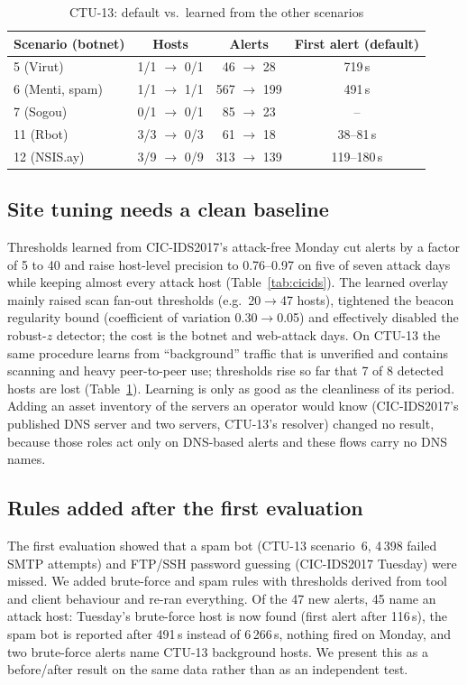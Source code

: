 \documentclass[conference]{IEEEtran}
\begin{document}
\begin{table}[t]
\caption{CTU-13: default vs.\ learned from the other scenarios}\label{tab:ctu}
\centering\footnotesize
\begin{tabular}{@{}lccc@{}}
\toprule
Scenario (botnet) & Hosts & Alerts & First alert (default) \\
\midrule
5 (Virut) & 1/1 $\to$ 0/1 & 46 $\to$ 28 & 719\,s \\
6 (Menti, spam) & 1/1 $\to$ 1/1 & 567 $\to$ 199 & 491\,s \\
7 (Sogou) & 0/1 $\to$ 0/1 & 85 $\to$ 23 & -- \\
11 (Rbot) & 3/3 $\to$ 0/3 & 61 $\to$ 18 & 38--81\,s \\
12 (NSIS.ay) & 3/9 $\to$ 0/9 & 313 $\to$ 139 & 119--180\,s \\
\bottomrule
\end{tabular}
\end{table}

\subsection{Site tuning needs a clean baseline}
Thresholds learned from CIC-IDS2017's attack-free Monday cut alerts by a factor of 5 to 40 and raise host-level precision to 0.76--0.97 on five of seven attack days while keeping almost every attack host (Table~\ref{tab:cicids}). The learned overlay mainly raised scan fan-out thresholds (e.g.\ 20$\to$47 hosts), tightened the beacon regularity bound (coefficient of variation 0.30$\to$0.05) and effectively disabled the robust-$z$ detector; the cost is the botnet and web-attack days. On CTU-13 the same procedure learns from ``background'' traffic that is unverified and contains scanning and heavy peer-to-peer use; thresholds rise so far that 7 of 8 detected hosts are lost (Table~\ref{tab:ctu}). Learning is only as good as the cleanliness of its period. Adding an asset inventory of the servers an operator would know (CIC-IDS2017's published DNS server and two servers, CTU-13's resolver) changed no result, because those roles act only on DNS-based alerts and these flows carry no DNS names.

\subsection{Rules added after the first evaluation}
The first evaluation showed that a spam bot (CTU-13 scenario~6, 4\,398 failed SMTP attempts) and FTP/SSH password guessing (CIC-IDS2017 Tuesday) were missed. We added brute-force and spam rules with thresholds derived from tool and client behaviour and re-ran everything. Of the 47 new alerts, 45 name an attack host: Tuesday's brute-force host is now found (first alert after 116\,s), the spam bot is reported after 491\,s instead of 6\,266\,s, nothing fired on Monday, and two brute-force alerts name CTU-13 background hosts. We present this as a before/after result on the same data rather than as an independent test.
\end{document}

